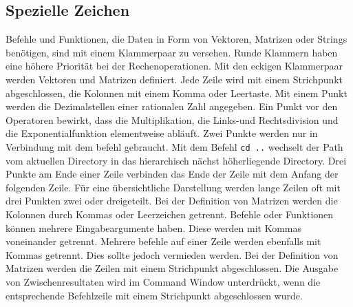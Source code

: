 {\subsection{Spezielle Zeichen}
Befehle und Funktionen, die Daten in Form von Vektoren, Matrizen oder Strings benötigen, sind mit einem Klammerpaar \boxed{\textbf{\texttt{( )}}} zu versehen. Runde Klammern haben eine höhere Priorität bei der Rechenoperationen.
\newline\newline
Mit den eckigen Klammerpaar \boxed{\textbf{\texttt{[ ]}}} werden Vektoren und Matrizen definiert. Jede Zeile wird mit einem Strichpunkt abgeschlossen, die Kolonnen mit einem Komma oder Leertaste.
\newline\newline
Mit einem Punkt  werden die Dezimalstellen einer rationalen Zahl angegeben. Ein Punkt vor den Operatoren bewirkt, dass die Multiplikation, die Links-und Rechtsdivision und die Exponentialfunktion elementweise abläuft.
\newline\newline
Zwei Punkte  werden nur in Verbindung mit dem befehl  gebraucht. Mit dem Befehl {\color{red}\texttt{cd ..}} wechselt der Path vom aktuellen Directory in das hierarchisch nächst höherliegende Directory.
\newline\newline
Drei Punkte  am Ende einer Zeile verbinden das Ende der Zeile mit dem Anfang der folgenden Zeile. Für eine übersichtliche Darstellung werden lange Zeilen oft mit drei Punkten zwei oder dreigeteilt.
\newline\newline
Bei der Definition von Matrizen werden die Kolonnen durch Kommas \boxed{\textbf{\texttt{,}}} oder Leerzeichen getrennt. Befehle oder Funktionen können mehrere Eingabeargumente haben. Diese werden mit Kommas voneinander getrennt. Mehrere befehle auf einer Zeile werden ebenfalls mit Kommas getrennt. Dies sollte jedoch vermieden werden.
\newline\newline
Bei der Definition von Matrizen werden die Zeilen mit einem Strichpunkt \boxed{\textbf{\texttt{;}}} abgeschlossen. Die Ausgabe von Zwischenresultaten wird im Command Window unterdrückt, wenn die entsprechende Befehlzeile mit einem Strichpunkt abgeschlossen wurde.
\newline\newline
}
